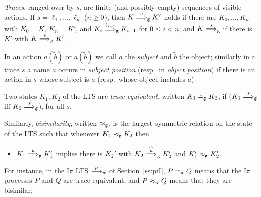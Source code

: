 \documentclass[11pt,a4paper]{amsart}
\theoremstyle{plain}
\theoremstyle{definition}
\theoremstyle{defC}
\theoremstyle{thmC}
\theoremstyle{plain}
\numberwithin{equation}{section}
\newcommand{\trace}{s}
\def\inp#1#2{#1(#2)}
\def\bout#1#2{\overline{#1}(#2)}   %
\newcommand{\rmm}[1]{{\tt{\lowercase{#1}}}}
\newcommand{\genarr}[2]{\mathrel{\stackrel{{#1}}{\longrightarrow}_{\rmm{\lowercase{#2}}}}}
\newcommand{\genArr}[2]{\mathrel{\stackrel{{#1}}{\Longrightarrow}_{\rmm{\lowercase{#2}}}}}  %
\newcommand{\genArcap}[2]{\mathrel{\stackrel{{\widehat{#1}}}{\Longrightarrow}_{\rm{\lowercase{#2}}}}}
\newcommand{\ArrG}[1]{\genArr{#1}{G}}   %
\newcommand{\ArcapG}[1]{\genArcap{#1}{G}}   %
\newcommand{\arrPI}[1]{\genarr{#1}{\pi}}   %
\newcommand{\genTE}[1]{\mathrel{\bumpeq_{\rmm{\lowercase{#1}}}}}       %
\newcommand{\genwb}[1]{\mathrel{\approx_{\rmm{\lowercase{#1}}}}}       %
\newcommand{\wbG}{\genwb{G}}       %
\newcommand{\wbPI}{\genwb{\pi}}       %
\newcommand{\TEG}{\genTE{G}}       %
\newcommand{\TEPI}{\genTE{\pi}}       %
\newcommand{\til}[1]{\widetilde{#1}}
\newcommand{\tilb}{{\til b}}
\newcommand{\Intp}{\mbox{I$\pi$}\xspace}   %
\newcommand{\piI}{\Intp}   %
\theoremstyle{plain}
\theoremstyle{definition}
\begin{document}
 \emph{Traces}, ranged over by $\trace$,  are finite (and possibly empty) sequences of
 visible actions.
If $\trace =\ell_1, \ldots, \ell_n$ ($n\geq 0$), then  $K \ArrG \trace K'$  holds if there
are $K_0, \ldots, K_n$ with $K_0 = K$, $K_n =K'$, and $K_i \ArrG{\ell_{i+1}} K_{i+1}$  for
$0\leq i < n$; and    $K \ArrG \trace $ if there is $K' $ with $K \ArrG \trace  K'$. 

In an action $\inp a\tilb$ or $\bout a\tilb$ we call $a$ the \emph{subject} and
$\tilb$ the object; similarly in a trace $s$ a name $a$ occurs in \emph{subject position}
(resp.\ in \emph{object position})
if there is an action in $s$ whose subject is $a$ (resp.\ whose object includes $a$). 

Two states $K_1, K_2 $ of the LTS   are \emph{trace equivalent}, written 
 $K_1 \TEG K_2$, if    ($K_1 \ArrG \trace $  iff 
$K_2 \ArrG \trace  $), for all $\trace$. 
 
Similarly,  \emph{bisimilarity}, written $\wbG $,
 is the largest symmetric relation on the state of the LTS such that 
whenever $K_1 \wbG K_2$ then 
\begin{itemize}
\item $K_1 \ArrG \mu  K_1'$ implies there is $K_2'$ with 
$K_2 \ArcapG \mu  K_2'$ and $K'_1 \wbG K'_2$.
\end{itemize} 
For instance, in the \piI LTS   $\arrPI \mu $ of Section~\ref{ss:piI}, 
$P \TEPI Q$ means that the \piI  processes $P$ and $Q$ are trace equivalent, and 
$P \wbPI Q$ means that they are bisimilar.
\end{document}
